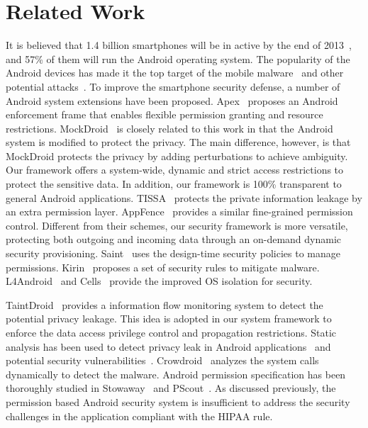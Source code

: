 \section{Related Work}
It is believed that 1.4 billion smartphones will be in active by the
end of 2013~\cite{rbiresearch}, and 57\% of them will run the Android
operating system. The popularity of the Android devices has made it
the top target of the mobile malware~\cite{Felt,Becher,xjiang_oak12}
and other potential attacks~\cite{Fahl,hijack}. To improve the
smartphone security defense, a number of Android system extensions
\cite{Nauman,Beresford,xjiang_11,Hornyack,Ongtang,Enck_ccs09,Lange,Andrus}
have been proposed. Apex~\cite{Nauman} proposes an Android enforcement
frame that enables flexible permission granting and resource
restrictions.  MockDroid~\cite{Beresford} is closely related to this
work in that the Android system is modified to protect the privacy.
The main difference, however, is that MockDroid protects the privacy
by adding perturbations to achieve ambiguity.  Our framework
offers a system-wide, dynamic and strict access restrictions to
protect the sensitive data.  In addition, our framework is 100\%
transparent to general Android applications.  TISSA~\cite{xjiang_11}
protects the private information leakage by an extra permission
layer. AppFence~\cite{Hornyack} provides a similar fine-grained
permission control.  Different from their schemes, our security
framework is more versatile, protecting both outgoing and 
incoming data through an on-demand dynamic security provisioning.
Saint~\cite{Ongtang} uses the design-time security policies to manage 
permissions. Kirin~\cite{Enck_ccs09} proposes a set of security rules
to mitigate malware.  L4Android~\cite{Lange} and Cells~\cite{Andrus}
provide the improved OS isolation for security.  


TaintDroid~\cite{taintdroid} provides a information flow monitoring
system to detect the potential privacy leakage. This idea is adopted
in our system framework to enforce the data access privilege control
and propagation restrictions.
Static analysis has been used to detect privacy leak in Android
applications~\cite{Batyuk} and potential security
vulnerabilities~\cite{Lu_ccs12}.  Crowdroid~\cite{Burguera} analyzes
the system calls dynamically to detect the malware.  Android
permission specification has been thoroughly studied in
Stowaway~\cite{Felt_ccs11} and PScout~\cite{Au_ccs12}.  As discussed
previously, the permission based Android security system is
insufficient to address the security challenges in the application
compliant with the HIPAA rule.

